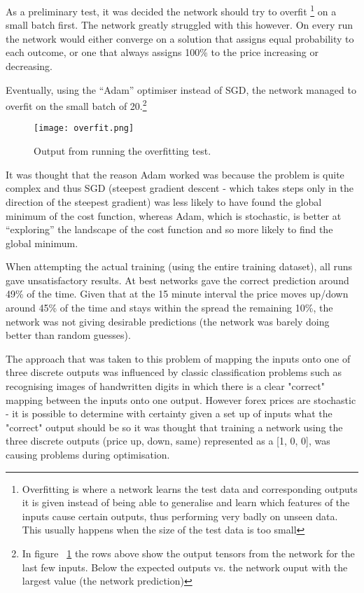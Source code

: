             As a preliminary test, it was decided the network should try to overfit \footnote{Overfitting is where a network learns the test data and corresponding outputs it is given instead of being able to generalise and learn which features of the inputs cause certain outputs, thus performing very badly on unseen data. This usually happens when the size of the test data is too small} on a small batch first. The network greatly struggled with this however. On every run the network would either converge on a solution that assigns equal probability to each outcome, or one that always assigns 100\% to the price increasing or decreasing.

            Eventually, using the “Adam” optimiser instead of SGD, the network managed to overfit on the small batch of 20.\footnote{In figure ~\ref{fig:Overfit} the rows above show the output tensors from the network for the last few inputs. Below the expected outputs vs. the network ouput with the largest value (the network prediction)}

            \begin{figure}[h]
                \centering
                \texttt{[image: overfit.png]}
                \caption{Output from running the overfitting test.}
                \label{fig:Overfit}
            \end{figure}
            

            It was thought that the reason Adam worked was because the problem is quite complex and thus SGD (steepest gradient descent - which takes steps only in the direction of the steepest gradient) was less likely to have found the global minimum of the cost function, whereas Adam, which is stochastic, is better at “exploring” the landscape of the cost function and so more likely to find the global minimum.

            When attempting the actual training (using the entire training dataset), all runs gave unsatisfactory results. At best networks gave the correct prediction around 49\% of the time. Given that at the 15 minute interval the price moves up/down around 45\% of the time and stays within the spread the remaining 10\%, the network was not giving desirable predictions (the network was barely doing better than random guesses).

            The approach that was taken to this problem of mapping the inputs onto one of three discrete outputs was influenced by classic classification problems such as recognising images of handwritten digits in which there is a clear "correct" mapping between the inputs onto one output. However forex prices are stochastic - it is possible to determine with certainty given a set up of inputs what the "correct" output should be so it was thought that training a network using the three discrete outputs (price up, down, same) represented as a [1, 0, 0], was causing problems during optimisation.

